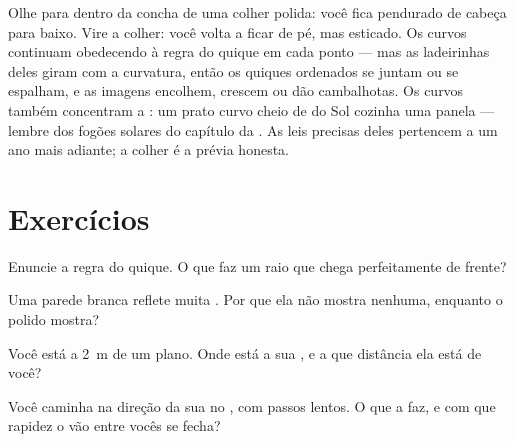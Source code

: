 \begin{remark}\label{rem:g5:mirrors-reflection:curved}
Olhe para dentro da concha de uma colher polida: você fica pendurado
de cabeça para baixo. Vire a colher: você volta a ficar de pé, mas
esticado. Os  curvos continuam obedecendo à regra do quique
em cada ponto --- mas as ladeirinhas deles giram com a curvatura,
então os quiques ordenados se juntam ou se espalham, e as imagens
encolhem, crescem ou dão cambalhotas. Os  curvos também
concentram a : um prato curvo cheio de  do Sol cozinha uma
panela --- lembre dos fogões solares do capítulo da . As leis
precisas deles pertencem a um ano mais adiante; a colher é a prévia
honesta.
\end{remark}

\section{Exercícios}

\begin{exercise}[$\star$]\label{exo:g5:mirrors-reflection:1}
Enuncie a regra do quique. O que faz um raio que chega perfeitamente
de frente?
\end{exercise}

\begin{exercise}[$\star$]\label{exo:g5:mirrors-reflection:2}
Uma parede branca reflete muita . Por que ela não mostra 
nenhuma, enquanto o  polido mostra?
\end{exercise}

\begin{exercise}[$\star$]\label{exo:g5:mirrors-reflection:3}
Você está a \qty{2}{m} de um  plano. Onde está a sua , e
a que distância ela está de você?
\end{exercise}

\begin{exercise}[$\star$]\label{exo:g5:mirrors-reflection:4}
Você caminha na direção da sua  no , com passos lentos.
O que a  faz, e com que rapidez o vão entre vocês se fecha?
\end{exercise}

